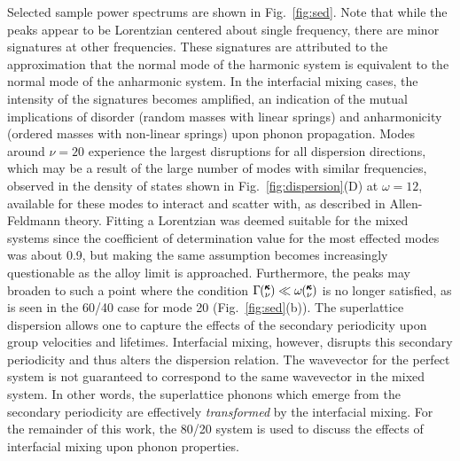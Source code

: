 Selected sample power spectrums are shown in Fig.~\ref{fig:sed}. Note that while the peaks appear to be Lorentzian centered about single frequency, there are minor signatures at other frequencies. These signatures are attributed to the approximation that the normal mode of the harmonic system is equivalent to the normal mode of the anharmonic system. In the interfacial mixing cases, the intensity of the signatures becomes amplified, an indication of the mutual implications of disorder (random masses with linear springs) and anharmonicity (ordered masses with non-linear springs) upon phonon propagation. \cite{RevModPhys.53.175}  Modes around $\nu=20$ experience the largest disruptions for all dispersion directions, which may be a result of the large number of modes with similar frequencies, observed in the density of states shown in Fig.~\ref{fig:dispersion}(D) at $\omega=12$, available for these modes to interact and scatter with, as described in Allen-Feldmann theory.\cite{allen_thermal_1993,feldman_thermal_1993-1} Fitting a Lorentzian was deemed suitable for the mixed systems since the coefficient of determination value \cite{Cowpe20081066} for the most effected modes was about 0.9, but making the same assumption becomes increasingly questionable as the alloy limit is approached. \cite{jason2013vc}  Furthermore, the peaks may broaden to such a point where the condition $\Gamma\mspace{-4.0mu}\left(\mspace{-8.0mu} \begin{smallmatrix}&\pmb{\kappa} \\&\nu\end{smallmatrix} \mspace{-3.0mu}\right) \ll \omega\mspace{-4.0mu}\left(\mspace{-8.0mu} \begin{smallmatrix}&\pmb{\kappa} \\&\nu\end{smallmatrix} \mspace{-3.0mu}\right)$ is no longer satisfied, as is seen in the 60/40 case for mode 20 (Fig.~\ref{fig:sed}(b)). The superlattice dispersion allows one to capture the effects of the secondary periodicity upon group velocities and lifetimes. Interfacial mixing, however, disrupts this secondary periodicity and thus alters the dispersion relation. The wavevector for the perfect system is not guaranteed to  correspond to the same wavevector in the mixed system. In other words, the superlattice phonons which emerge from the secondary periodicity are effectively \textit{transformed} by the interfacial mixing. For the remainder of this work, the 80/20 system is used to discuss the effects of interfacial mixing upon phonon properties.
\renewcommand{\topfraction}{1.0}
\begin{figure*}%
\begin{center}
\renewcommand{\figure}{Fig.}
\caption{(Colour online) Plots of the power spectrums for the selected modes as indicated by the red square markers in Fig.~\ref{fig:dispersion}(A-C). Dark blue corresponds to a superlattice without mixing, red corresponds to mixing of 80/20 and light blue corresponds to mixing of 60/40. Lifetimes calculated from the fitting of the Lorentzian functions (not shown) for the three systems are presented.}
\label{fig:sed}
\end{center}
\end{figure*}

